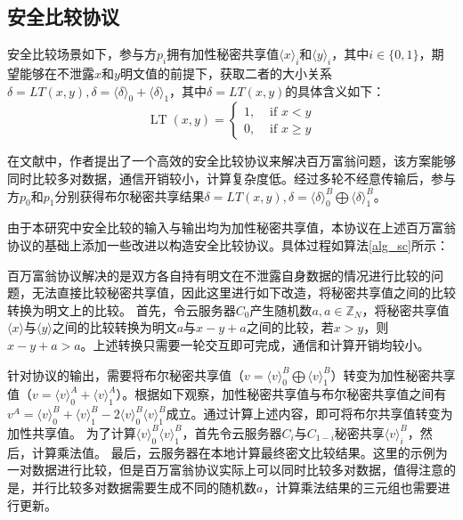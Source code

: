 \subsection{安全比较协议}
\label{s3-securecomparison}
安全比较场景如下，参与方$p_i$拥有加性秘密共享值$\langle x \rangle_i$和$\langle y \rangle_i$，其中$i \in \{0, 1\}$，期望能够在不泄露$x$和$y$明文值的前提下，获取二者的大小关系$\delta = LT(x, y), \delta = \langle \delta \rangle_0 + \langle \delta \rangle_1$，其中$\delta = LT(x, y)$的具体含义如下：
\begin{equation}
	\operatorname{LT}(x, y)= \begin{cases}1, & \text { if } x<y \\ 0, & \text { if } x \geq y\end{cases}
\end{equation}

在文献\cite{rathee2020cryptflow2}中，作者提出了一个高效的安全比较协议来解决百万富翁问题，该方案能够同时比较多对数据，通信开销较小，计算复杂度低。经过多轮不经意传输后，参与方$p_0$和$p_1$分别获得布尔秘密共享结果$\delta = LT(x, y) ,\delta = \langle \delta \rangle^B_0 \bigoplus \langle \delta \rangle^B_1$。

由于本研究中安全比较的输入与输出均为加性秘密共享值，本协议在上述百万富翁协议的基础上添加一些改进以构造安全比较协议。具体过程如算法\ref{alg_sc}所示：

百万富翁协议解决的是双方各自持有明文在不泄露自身数据的情况进行比较的问题，无法直接比较秘密共享值，因此这里进行如下改造，将秘密共享值之间的比较转换为明文上的比较。
首先，令云服务器$C_0$产生随机数$a,a\in\mathbb{Z}_N$，将秘密共享值$\langle x \rangle$与$\langle y\rangle$之间的比较转换为明文$a$与$x-y+a$之间的比较，若$x>y$，则$x-y+a>a$。上述转换只需要一轮交互即可完成，通信和计算开销均较小。

针对协议的输出，需要将布尔秘密共享值（$v=\langle v\rangle^B_0 \bigoplus \langle v\rangle^B_1$）转变为加性秘密共享值（$v=\langle v\rangle^A_0+\langle v \rangle^A_1$）。根据如下观察，加性秘密共享值与布尔秘密共享值之间有$v^A=\langle v\rangle^B_0+\langle v\rangle^B_1 - 2\langle v\rangle^B_0 \langle v\rangle^B_1$成立。通过计算上述内容，即可将布尔共享值转变为加性共享值。
为了计算$\langle v\rangle^B_0 \langle v\rangle^B_1$，首先令云服务器$C_i$与$C_{1-i}$秘密共享$\langle v \rangle_i^B$，然后，计算乘法值。
最后，云服务器在本地计算最终密文比较结果。这里的示例为一对数据进行比较，但是百万富翁协议实际上可以同时比较多对数据，值得注意的是，并行比较多对数据需要生成不同的随机数$ a $，计算乘法结果的三元组也需要进行更新。

